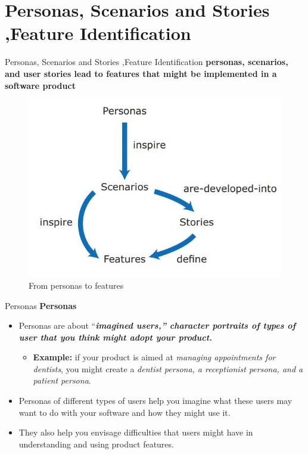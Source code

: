 \documentclass{beamer}
\begin{document}
\section{Personas, Scenarios and Stories ,Feature Identification}
\begin{frame}{Personas, Scenarios and Stories ,Feature Identification}
	\textbf{personas, scenarios, and user stories lead to features 
		that might be implemented in a software product}
	\begin{figure}
		\includegraphics[scale=.5]{img/m2_19.jpg}
			\caption{From personas to features }
	\end{figure}
\end{frame}
\begin{frame}{Personas}
	\textbf{Personas}
	\begin{itemize}
		\item Personas are about “\textbf{\textit{imagined users,” character portraits of types of user that you think might adopt your product.}}
		\begin{itemize}
			\item \textbf{Example:} if your product is aimed at\textit{ managing appointments for dentists}, you might create a \textit{ dentist persona, a receptionist persona, and a patient persona}. 
		\end{itemize}
	\item Personas of different types of users help you imagine what these 
	users may want to do with your software and how they might use it.
	\item They also help you envisage difficulties that users might have in 
	understanding and using product features.
	\end{itemize}
\end{frame}
\end{document}
